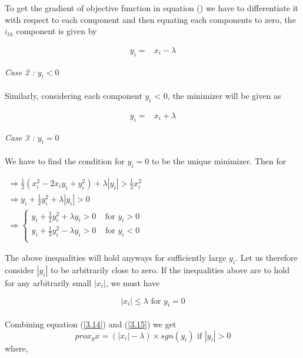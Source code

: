 To get the gradient of objective function in equation () we have to differentiate it with respect to each component and 
then equating each components to zero, the $i_{th}$ component is given by

\begin{equation}
 \begin{array}{rl}
  y_i =& x_i -\lambda
 \end{array}
\label{3.14}
\end{equation}

\emph{Case 2 : $y_i < 0$}\\\\

Similarly, considering each component $y_i$ < 0, the minimizer will be given as

\begin{equation}
 \begin{array}{rl}
  y_i =& x_i +\lambda
 \end{array}
\label{3.15}
\end{equation}
  
\emph{Case 3 : $y_i = 0$}\\\\
We have to find the condition for $y_i=0$ to be the unique minimizer. Then for 
\begin{center}
 
$
\begin{array}{ll}
\Rightarrow \frac{1}{2}(x_i^2-2x_iy_i+y_i^2) + \lambda |y_i| > \frac{1}{2}x_i^2\\
\Rightarrow y_i+\frac{1}{2}y_i^2 + \lambda |y_i| > 0\\
\Rightarrow \left\lbrace \begin{array}{ll}
 y_i+\frac{1}{2}y_i^2 + \lambda y_i > 0 & \mbox{ for } y_i>0\\
y_i+\frac{1}{2}y_i^2 - \lambda y_i > 0 & \mbox{ for } y_i<0\\
\end{array}\right.
\end{array}
$
\end{center}
The above inequalities will hold anyways for sufficiently large $y_i$. Let us therefore 
consider $|y_i|$ to be arbitrarily close to zero. If the inequalities above are to hold for
any arbitrarily small $|x_i|$, we must have

\begin{equation}
|x_i|\leq \lambda \mbox{ for } y_i = 0
\label{3.16}
\end{equation}

\paragraph{}Combining equation (\ref{3.14}) and (\ref{3.15}) we get
\begin{equation}
 prox_gx = (|x_i|-\lambda) \times sgn(y_i) \mbox{ if } |y_i| >0
\label{3.17}
\end{equation}
where,

